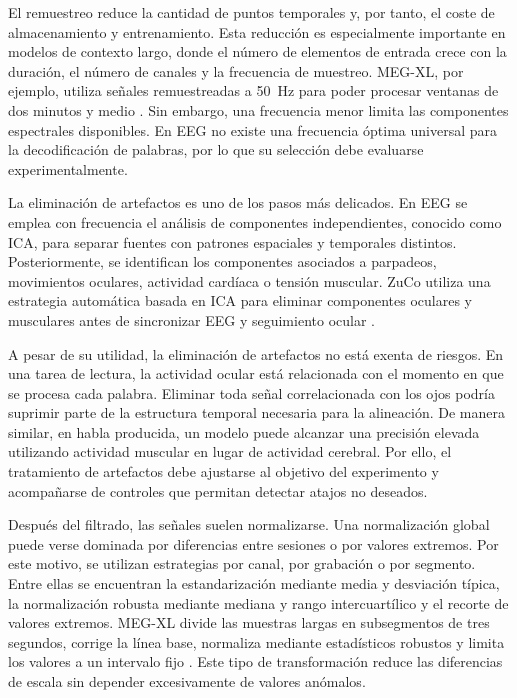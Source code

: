 El remuestreo reduce la cantidad de puntos temporales y, por tanto, el coste de almacenamiento y entrenamiento. Esta reducción es especialmente importante en modelos de contexto largo, donde el número de elementos de entrada crece con la duración, el número de canales y la frecuencia de muestreo. MEG-XL, por ejemplo, utiliza señales remuestreadas a 50~Hz para poder procesar ventanas de dos minutos y medio \cite{jayalath2026megxl}. Sin embargo, una frecuencia menor limita las componentes espectrales disponibles. En EEG no existe una frecuencia óptima universal para la decodificación de palabras, por lo que su selección debe evaluarse experimentalmente.

La eliminación de artefactos es uno de los pasos más delicados. En EEG se emplea con frecuencia el análisis de componentes independientes, conocido como ICA, para separar fuentes con patrones espaciales y temporales distintos. Posteriormente, se identifican los componentes asociados a parpadeos, movimientos oculares, actividad cardíaca o tensión muscular. ZuCo utiliza una estrategia automática basada en ICA para eliminar componentes oculares y musculares antes de sincronizar EEG y seguimiento ocular \cite{hollenstein2020zuco2}.

A pesar de su utilidad, la eliminación de artefactos no está exenta de riesgos. En una tarea de lectura, la actividad ocular está relacionada con el momento en que se procesa cada palabra. Eliminar toda señal correlacionada con los ojos podría suprimir parte de la estructura temporal necesaria para la alineación. De manera similar, en habla producida, un modelo puede alcanzar una precisión elevada utilizando actividad muscular en lugar de actividad cerebral. Por ello, el tratamiento de artefactos debe ajustarse al objetivo del experimento y acompañarse de controles que permitan detectar atajos no deseados.

Después del filtrado, las señales suelen normalizarse. Una normalización global puede verse dominada por diferencias entre sesiones o por valores extremos. Por este motivo, se utilizan estrategias por canal, por grabación o por segmento. Entre ellas se encuentran la estandarización mediante media y desviación típica, la normalización robusta mediante mediana y rango intercuartílico y el recorte de valores extremos. MEG-XL divide las muestras largas en subsegmentos de tres segundos, corrige la línea base, normaliza mediante estadísticos robustos y limita los valores a un intervalo fijo \cite{jayalath2026megxl}. Este tipo de transformación reduce las diferencias de escala sin depender excesivamente de valores anómalos.


